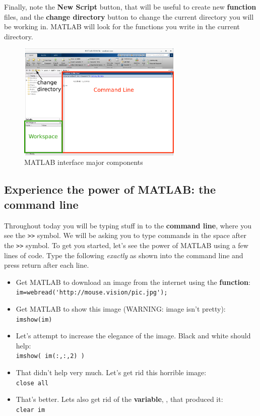 \documentclass{article}
\begin{document}
Finally, note the \textbf{New Script} button, that will be useful to create new \textbf{function} files,
and the \textbf{change directory} button to change the current directory you will be working in. MATLAB will
look for the functions you write in the current directory.

\begin{figure}[h]
  \centering
  \includegraphics[width=0.7\textwidth]{interface.pdf}
  \caption{MATLAB interface major components}\label{fig:interface}
\end{figure}

\pagebreak

\subsection*{Experience the power of MATLAB: the command line}
Throughout today you will be typing stuff in to the \textbf{command line}, where you see the \verb|>>| symbol.
We will be asking you to type commands in the space after the \verb|>>| symbol.
To get you started, let's see the power of MATLAB using a few lines of code.
Type the following \emph{exactly} as shown into the command line and press return after each line.\\

\begin{itemize}
\item Get MATLAB to download an image from the internet using the  \textbf{function}:\\
\verb|im=webread('http://mouse.vision/pic.jpg');|\\
\item Get MATLAB to show this image (WARNING: image isn't pretty):\\
\verb|imshow(im)|\\
\item Let's attempt to increase the elegance of the image. Black and white should help:\\
\verb|imshow( im(:,:,2) )|\\
\item That didn't help very much. Let's get rid this horrible image:\\
\verb|close all|\\
\item That's better. Lets also get rid of the \textbf{variable}, , that produced it:\\
\verb|clear im|\\
\end{itemize}
\end{document}
